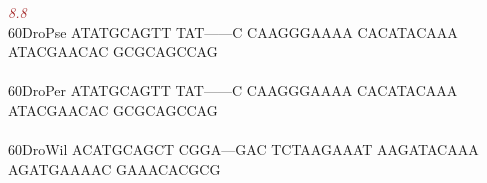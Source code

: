 \documentclass[11pt,twoside,reqno,a4paper]{article}
\begin{document}
{\hspace*{4\charwidth}\hspace*{7\charwidth}\hspace*{6\charwidth}\textit{\textcolor{brown}{8.8}}\hspace*{1\charwidth}\hspace*{1\charwidth}\hspace*{1\charwidth}\hspace*{1\charwidth}\hspace*{1\charwidth}\hspace*{1\charwidth}\\
60\hspace*{2\charwidth}DroPse	ATATGCAGTT	TAT------C	CAAGGGAAAA	CACATACAAA	ATACGAACAC	GCGCAGCCAG	\\
\hspace*{4\charwidth}\hspace*{7\charwidth}\hspace*{1\charwidth}\hspace*{1\charwidth}\hspace*{1\charwidth}\hspace*{1\charwidth}\hspace*{1\charwidth}\hspace*{1\charwidth}\\
60\hspace*{2\charwidth}DroPer	ATATGCAGTT	TAT------C	CAAGGGAAAA	CACATACAAA	ATACGAACAC	GCGCAGCCAG	\\
\hspace*{4\charwidth}\hspace*{7\charwidth}\hspace*{1\charwidth}\hspace*{1\charwidth}\hspace*{1\charwidth}\hspace*{1\charwidth}\hspace*{1\charwidth}\hspace*{1\charwidth}\\
60\hspace*{2\charwidth}DroWil	ACATGCAGCT	CGGA---GAC	TCTAAGAAAT	AAGATACAAA	AGATGAAAAC	GAAACACGCG	\\
\hspace*{4\charwidth}\hspace*{7\charwidth}\hspace*{1\charwidth}\hspace*{1\charwidth}\hspace*{1\charwidth}\hspace*{1\charwidth}\hspace*{1\charwidth}\hspace*{1\charwidth}\\
}
\end{document}
